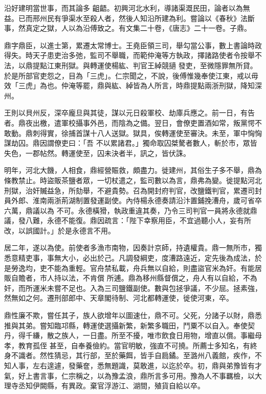 \begin{pinyinscope}
 沿好建明當世事，而其論多
 齟齬。初興河北水利，導諸渠溉民田，論者以為無益。已而邢州民有爭渠水至殺人者，然後人知沿所建為利。嘗論以《春秋》法斷事，然真定之獄，人以為沿傅致之。有文集二十卷，《唐志》二十一卷。子鼎。



 鼎字鼎臣，以進士第，累遷太常博士。王堯臣領三司，舉勾當公事，數上書論時政得失。時天子患吏治多弛，監司不舉職，而範仲淹等方執政，擇諸路使者令按舉不法，以鼎提點江東刑獄。與轉運使楊紘、判官王綽競擿
 發吏，至微隱罪無所貸。於是所部官吏怨之，目為「三虎」。仁宗聞之，不說，後傅惟幾奉使江東，戒以毋效「三虎」為也。仲淹等罷，鼎與紘、綽皆為人所言，時鼎提點兩浙刑獄，降知深州。



 王則以貝州反，深卒龐旦與其徒，謀以元日殺軍校、劫庫兵應之。前一日，有告者。鼎夜出檄，遣軍校攝事外邑，而陰為之備。翌日，會僚吏置酒如常，叛黨愕不敢動。鼎刺得實，徐捕首謀十八人送獄。獄具，俟轉運使至審決。未至，軍中恟恟謀劫囚。鼎因謂僚吏曰：「吾
 不以累諸君。」獨命取囚桀驁者數人，斬於市，眾皆失色，一郡帖然。轉運使至，囚未決者半，訊之，皆伏誅。



 明年，河北大饑，人相食，鼎經營賑救，頗盡力。徙建州，其俗生子多不舉，鼎為條教禁止。時盜販茶鹽者眾，一切杖遣之，監司數以為言，鼎弗為變。徙提點河北刑獄，治奸贓益急，所劾舉，不避貴勢。召為開封府判官，改鹽鐵判官，累遷司封員外郎、淮南兩浙荊湖制置發運副使。內侍楊永德奏請沿汴置鋪挽漕舟，歲可省卒六萬，鼎議以為
 不可。永德橫猾，執政重違其奏，乃令三司判官一員將永德就鼎議，發八難，永德不能復。鼎因疏言：「陛下幸察用臣，不宜過聽小人，妄有所改，以誤國計。」於是永德言不用。



 居二年，遂以為使。前使者多漁市南物，因奏計京師，持遺權貴。鼎一無所市，獨悉意精吏事，事無大小，必出於己。凡調發綱吏，度漕路遠近，定先後為成法，於是勞逸均，吏不能為重輕。官舟禁私載，舟兵無以自給，則盡盜官米為奸。有能居販自贍者，市人持以法，不肯償
 所逋。鼎為移州縣督償之，舟人有以自給，不為奸，而所運米未嘗不足也。入為三司鹽鐵副使。數與包拯爭議，不少屈。拯素強，然無如之何。遷刑部郎中、天章閣待制、河北都轉運使，徙使河東，卒。



 鼎性廉不欺，嘗任其子，族人欲增年以圖速仕，鼎不可。父死，分諸子以財，鼎悉推與其弟。嘗知臨邛縣，轉運使選攝新繁，新繁多職田，鬥粟不以自入。奉使契丹，得千縑，散之族人，一日盡。所至不擾，唯市飲食日用物，增直以償。事繼母孝，教育孤侄
 甚至，自奉養儉約。當官明敏，強直不可撓。所薦士多知名，有終身不識者。然性猜忌，其行部，至於藥餌，皆手自扃鐍。至潞州八義館，疾作，不知人事，左右遑遽，發藥奩，悉無題識，莫敢進，以迄於卒。初，鼎與弟豫皆有才氣，好上書言事，仁宗稱之，以為豫孟浪，鼎所言多可用。豫為人不事羈檢，以大理寺丞知伊闕縣，有異政。棄官浮游江、湖間，殖貨自給以卒。




\end{pinyinscope}
